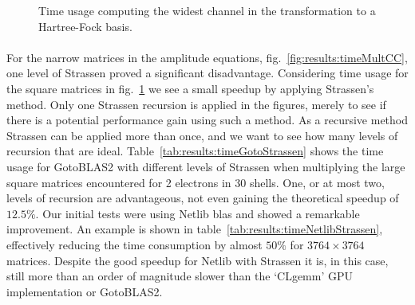 \begin{figure}
\begin{center}
{}
\caption{Time usage computing the widest channel in the transformation to a Hartree-Fock basis.}
\label{fig:results:timeMultHFsys}
\end{center}
\end{figure}

\paragraph{}
For the narrow matrices in the amplitude equations, fig.~\ref{fig:results:timeMultCC}, one level of Strassen proved a significant disadvantage.
Considering time usage for the square matrices in fig.~\ref{fig:results:timeMultHFsys} we see  a small speedup by applying Strassen's method.
Only one Strassen recursion is applied in the figures, merely to see if there is a potential performance gain using such a method.
As a recursive method Strassen can be applied more than once, and we want to see how many levels of recursion that are ideal.
Table~\ref{tab:results:timeGotoStrassen} shows the time usage for GotoBLAS2 with different levels of Strassen when multiplying the large square matrices encountered for 2 electrons in 30 shells.
One, or at most two, levels of recursion are advantageous, not even gaining the theoretical speedup of $12.5\%$.
Our initial tests were using Netlib blas and showed a remarkable improvement.
An example is shown in table~\ref{tab:results:timeNetlibStrassen}, effectively reducing the time consumption by almost $50\%$ for $3764 \times 3764$ matrices.
Despite the good speedup for Netlib with Strassen it is, in this case, still more than an order of magnitude slower than the `CLgemm' GPU implementation or  GotoBLAS2.

